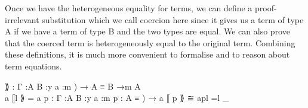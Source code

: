 \documentclass{acm_proc_article-sp}
\begin{document}
Once we have the heterogeneous equality for terms, we can define a proof-irrelevant substitution which we call coercion here
since it gives us a term of type A if we have a term of type B and the
two types are equal. We can also prove that the coerced term is heterogeneously equal to the
original term. Combining these definitions, it is much
more convenient to formalise and to reason about term equations.

\begin{code}%
\>⟫        : \AgdaBound{\{}Γ :\AgdaBound{\{}A B :y \AgdaBound{(}a :m ) 
            → A ≡ B →m A\<%
\\
\>a ⟦l ⟫  = a
p       : \AgdaBound{\{}Γ :\AgdaBound{\{}A B :y \AgdaBound{\{}a :m \AgdaBound{(}p : A ≡ ) 
            → a ⟦ p ⟫ ≅ apl  =l \_
\<%
\end{code}


\end{document}
